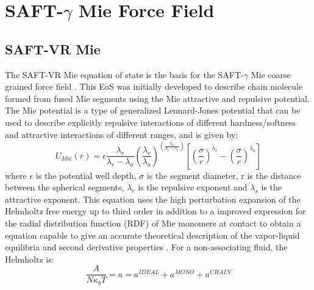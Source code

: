 
\chapter{SAFT-$\gamma$ Mie Force Field} %

\label{ChapterX} %


\section{SAFT-VR Mie}

The SAFT-VR Mie equation of state \cite{lafitte2013} is the basis for the SAFT-$\gamma$ Mie coarse grained force field \cite{avendano2011}. This EoS was initially developed to describe chain molecule formed from fused Mie segments using the Mie attractive and repulsive potential. The Mie potential is a type of generalized Lennard-Jones potential that can be used to describe explicitly repulsive interactions of different hardness/softness and attractive interactions of different ranges, and is given by:
\begin{equation}
U_{Mie}(r) = \epsilon\frac{\lambda_r}{\lambda_r - \lambda_a} \left(\frac{\lambda_r}{\lambda_a} \right)^{\left( \frac{\lambda_a}{\lambda_r - \lambda_a} \right)}
\left[ \left(\frac{\sigma}{r} \right)^{\lambda_r} - \left(\frac{\sigma}{r} \right)^{\lambda_a} \right]
\label{eqn:miepotential}
\end{equation}
where $\epsilon$ is the potential well depth, $\sigma$ is the segment diameter, r is the distance between the spherical segments, $\lambda_r$ is the repulsive exponent and $\lambda_s$ is the attractive exponent. This equation uses the  high perturbation expansion of the Helmholtz free energy up to third order in addition to a improved expression for the  radial distribution function (RDF) of Mie monomers at contact to obtain a equation capable to give an accurate theoretical description of the vapor-liquid equilibria and second derivative properties \cite{lafitte2013}. For a non-associating fluid, the Helmholtz is:
\begin{equation}
\frac{A}{N\kappa_{b}T} = a = a^{IDEAL} + a^{MONO} + a^{CHAIN}
\label{eqn:miehelm}
\end{equation}

